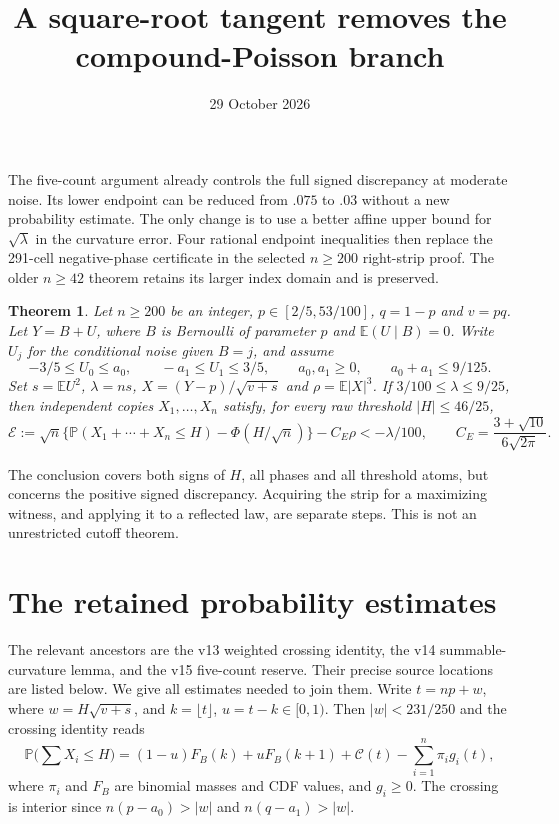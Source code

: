 \documentclass[11pt,a4paper]{article}
\title{A square-root tangent removes the compound-Poisson branch}
\author{}\date{29 October 2026}
\newtheorem{theorem}{Theorem}\newtheorem{corollary}[theorem]{Corollary}
\newcommand{\E}{\mathbb E}\newcommand{\Pp}{\mathbb P}
\begin{document}
\maketitle

The five-count argument already controls the full signed discrepancy at
moderate noise. Its lower endpoint can be reduced from $.075$ to $.03$
without a new probability estimate. The only change is to use a better
affine upper bound for $\sqrt\lambda$ in the curvature error. Four rational
endpoint inequalities then replace the 291-cell negative-phase certificate
in the selected $n\ge200$ right-strip proof. The older $n\ge42$ theorem
retains its larger index domain and is preserved.

\begin{theorem}\label{thm:new}
Let $n\ge200$ be an integer, $p\in[2/5,53/100]$, $q=1-p$ and $v=pq$.
Let $Y=B+U$, where $B$ is Bernoulli of parameter $p$ and $\E(U\mid B)=0$.
Write $U_j$ for the conditional noise given $B=j$, and assume
\[
 -3/5\le U_0\le a_0,\qquad -a_1\le U_1\le3/5,\qquad
 a_0,a_1\ge0,\qquad a_0+a_1\le9/125.
\]
Set $s=\E U^2$, $\lambda=ns$, $X=(Y-p)/\sqrt{v+s}$ and
$\rho=\E|X|^3$. If $3/100\le\lambda\le9/25$, then independent copies
$X_1,\ldots,X_n$ satisfy, for every raw threshold $|H|\le46/25$,
\begin{equation}\label{eq:target}
 \mathcal E:=\sqrt n\{\Pp(X_1+\cdots+X_n\le H)-\Phi(H/\sqrt n)\}
             -C_E\rho<-\lambda/100,
 \qquad C_E=\frac{3+\sqrt{10}}{6\sqrt{2\pi}}.
\end{equation}
\end{theorem}

The conclusion covers both signs of $H$, all phases and all threshold
atoms, but concerns the positive signed discrepancy. Acquiring the strip
for a maximizing witness, and applying it to a reflected law, are separate
steps. This is not an unrestricted cutoff theorem.

\section{The retained probability estimates}
The relevant ancestors are the v13 weighted crossing identity, the v14
summable-curvature lemma, and the v15 five-count reserve. Their precise
source locations are listed below. We give all estimates needed to join them.
Write $t=np+w$, where $w=H\sqrt{v+s}$, and $k=\lfloor t\rfloor$,
$u=t-k\in[0,1)$. Then $|w|<231/250$ and the crossing identity reads
\begin{equation}\label{eq:cross}
 \Pp\Big(\sum X_i\le H\Big)
 =(1-u)F_B(k)+uF_B(k+1)+\mathcal C(t)-\sum_{i=1}^n\pi_i g_i(t),
\end{equation}
where $\pi_i$ and $F_B$ are binomial masses and CDF values, and $g_i\ge0$.
The crossing is interior since
$n(p-a_0)>|w|$ and $n(q-a_1)>|w|$.
\end{document}
